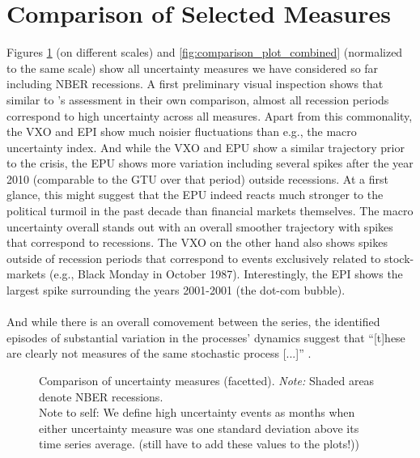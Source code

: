 \documentclass[a4paper,12pt,oneside,pointednumbers,bibtotoc,bigheadings,liststotoc]{scrbook}
\begin{document}
\section{Comparison of Selected Measures}
Figures \ref{fig:comparison_plot} (on different scales) and \ref{fig:comparison_plot_combined} (normalized to the same scale) show all uncertainty measures we have considered so far including NBER recessions. A first preliminary visual inspection shows that similar to \citet{bachmannetal:13}'s assessment in their own comparison, almost all recession periods correspond to high uncertainty across all measures. Apart from this commonality, the VXO and EPI show much noisier fluctuations than e.g., the macro uncertainty index. And while the VXO and EPU show a similar trajectory prior to the crisis, the EPU shows more variation including several spikes after the year 2010 (comparable to the GTU over that period) outside recessions. At a first glance, this might suggest that the EPU indeed reacts much stronger to the political turmoil in the past decade than financial markets themselves. The macro uncertainty overall stands out with an overall smoother trajectory with spikes that correspond to recessions. The VXO on the other hand also shows spikes outside of recession periods that correspond to events exclusively related to stock-markets (e.g., Black Monday in October 1987). Interestingly, the EPI shows the largest spike surrounding the years 2001-2001 (the dot-com bubble). \\
\\
And while there is an overall comovement between the series, the identified episodes of substantial variation in the processes' dynamics suggest that ``[t]hese are clearly not measures of the same stochastic process [...]'' \citep[p. ]{orlikandveldkamp:14}.

\begin{figure}[!ht]
   \centering
   \setlength\fboxsep{0pt}
   \setlength\fboxrule{0pt}
      \caption[Comparison of uncertainty measures (facetted).]{Comparison of uncertainty measures (facetted).
      \textit{Note:} Shaded areas denote NBER recessions.\\
      Note to self: We define high uncertainty events as months when either uncertainty measure was one standard deviation above its time series average. (still have to add these values to the plots!))}   \label{fig:comparison_plot}
\end{figure}
\end{document}
